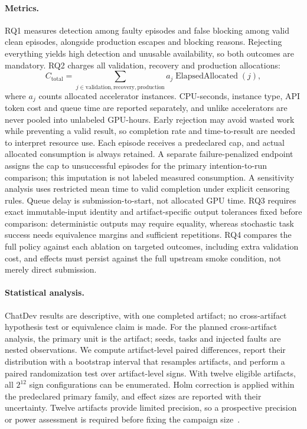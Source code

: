 \documentclass[pdflatex,sn-mathphys-num]{sn-jnl}
\theoremstyle{thmstylethree}
\begin{document}
\paragraph{Metrics.} RQ1 measures detection among faulty episodes and false blocking among valid clean episodes, alongside production escapes and blocking reasons. Rejecting everything yields high detection and unusable availability, so both outcomes are mandatory. RQ2 charges all validation, recovery and production allocations:
\begin{equation}
C_{\mathrm{total}}=\sum_{j\in\mathrm{validation,recovery,production}}a_j\operatorname{ElapsedAllocated}(j),
\end{equation}
where $a_j$ counts allocated accelerator instances. CPU-seconds, instance type, API token cost and queue time are reported separately, and unlike accelerators are never pooled into unlabeled GPU-hours. Early rejection may avoid wasted work while preventing a valid result, so completion rate and time-to-result are needed to interpret resource use. Each episode receives a predeclared cap, and actual allocated consumption is always retained. A separate failure-penalized endpoint assigns the cap to unsuccessful episodes for the primary intention-to-run comparison; this imputation is not labeled measured consumption. A sensitivity analysis uses restricted mean time to valid completion under explicit censoring rules. Queue delay is submission-to-start, not allocated GPU time. RQ3 requires exact immutable-input identity and artifact-specific output tolerances fixed before comparison: deterministic outputs may require equality, whereas stochastic task success needs equivalence margins and sufficient repetitions. RQ4 compares the full policy against each ablation on targeted outcomes, including extra validation cost, and effects must persist against the full upstream smoke condition, not merely direct submission.

\paragraph{Statistical analysis.} ChatDev results are descriptive, with one completed artifact; no cross-artifact hypothesis test or equivalence claim is made. For the planned cross-artifact analysis, the primary unit is the artifact; seeds, tasks and injected faults are nested observations. We compute artifact-level paired differences, report their distribution with a bootstrap interval that resamples artifacts, and perform a paired randomization test over artifact-level signs. With twelve eligible artifacts, all $2^{12}$ sign configurations can be enumerated. Holm correction is applied within the predeclared primary family, and effect sizes are reported with their uncertainty. Twelve artifacts provide limited precision, so a prospective precision or power assessment is required before fixing the campaign size~\cite{wohlin2012experimentation}.
\end{document}
